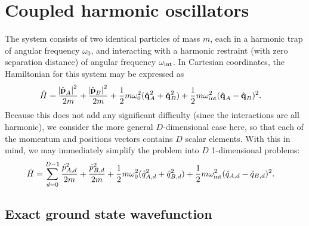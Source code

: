 \chapter{Coupled harmonic oscillators}

\label{chap:oscillators}


The system consists of two identical particles of mass $m$, each in a harmonic trap of angular frequency $\omega_0$, and interacting with a harmonic restraint (with zero separation distance) of angular frequency $\omega_\text{int}$.
In Cartesian coordinates, the Hamiltonian for this system may be expressed as
\begin{align}
	\hat{H}
	&= \frac{\abs{\hat{\bm{\mathbf{p}}}_A}^2}{2 m} + \frac{\abs{\hat{\bm{\mathbf{p}}}_B}^2}{2 m}
		+ \frac{1}{2} m \omega_0^2 (\hat{\bm{\mathbf{q}}}_A^2 + \hat{\bm{\mathbf{q}}}_B^2)
		+ \frac{1}{2} m \omega_\text{int}^2 (\hat{\bm{\mathbf{q}}}_A - \hat{\bm{\mathbf{q}}}_B)^2.
\end{align}
Because this does not add any significant difficulty (since the interactions are all harmonic), we consider the more general $D$-dimensional case here, so that each of the momentum and positions vectors contains $D$ scalar elements.
With this in mind, we may immediately simplify the problem into $D$ 1-dimensional problems:
\begin{align}
	\hat{H}
	&= \sum_{d=0}^{D-1}
			\frac{\hat{p}_{A,d}^2}{2 m} + \frac{\hat{p}_{B,d}^2}{2 m}
			+ \frac{1}{2} m \omega_0^2 (\hat{q}_{A,d}^2 + \hat{q}_{B,d}^2)
			+ \frac{1}{2} m \omega_\text{int}^2 (\hat{q}_{A,d} - \hat{q}_{B,d})^2.
\end{align}


\section{Exact ground state wavefunction}

